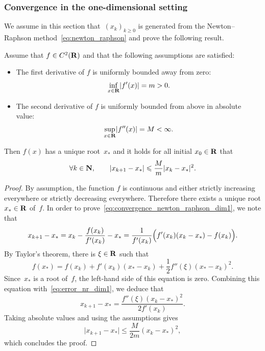 \subsubsection*{Convergence in the one-dimensional setting}
We assume in this section that~$(x_k)_{k\geq 0}$ is generated from the Newton--Raphson method~\eqref{eq:newton_raphson} and prove the following result.
\begin{theorem}
    \label{theorem:newton_raphson_1d}
    Assume that $f \in C^2(\mathbf R)$ and that the following assumptions are satisfied:
    \begin{itemize}
        \item
            The first derivative of $f$ is uniformly bounded away from zero:
            \[
                \inf_{x \in \mathbf R} \lvert f'(x)\rvert = m > 0.
            \]

        \item
            The second derivative of $f$ is uniformly bounded from above in absolute value:
            \[
                \sup_{x \in \mathbf R} \lvert f''(x)\rvert = M < \infty.
            \]
    \end{itemize}
    Then $f(x)$ has a unique root~$x_*$ and it holds for all initial $x_0 \in \mathbf R$ that
    \begin{equation}
        \label{eq:convergence_newton_raphson_dim1}
        \forall k \in \mathbf N, \qquad
        \lvert x_{k+1} - x_*\rvert \leqslant \frac{M}{m} \lvert x_{k} - x_*\rvert^2.
    \end{equation}
\end{theorem}
\begin{proof}
    By assumption, the function $f$ is continuous and either strictly increasing everywhere or strictly decreasing everywhere.
    Therefore there exists a unique root $x_* \in \mathbf R$ of~$f$.
    In order to prove~\eqref{eq:convergence_newton_raphson_dim1},
    we note that
    \begin{equation}
        \label{eq:error_nr_dim1}
        x_{k+1} - x_*
        = x_{k} - \frac{f(x_k)}{f'(x_k)}  - x_*
        = \frac{1}{f'(x_k)} \Bigl(f'(x_k)(x_{k} - x_*) - f(x_k)\Bigr).
    \end{equation}
    By Taylor's theorem, there is $\xi \in \mathbf R$ such that
    \[
        f(x_*) = f(x_k) + f'(x_k) (x_* - x_k) + \frac{1}{2} f''(\xi) (x_* - x_k)^2.
    \]
    Since~$x_*$ is a root of~$f$,
    the left-hand side of this equation is zero.
    Combining this equation with~\eqref{eq:error_nr_dim1},
    we deduce that
    \[
        x_{k+1} - x_*  = \frac{f''(\xi) (x_k - x_*)^2}{2f'(x_k)}.
    \]
    Taking absolute values and using the assumptions gives
    \[
        \lvert x_{k+1} - x_* \rvert
        \leq \frac{M}{2m} (x_k - x_*)^2,
    \]
    which concludes the proof.
\end{proof}


